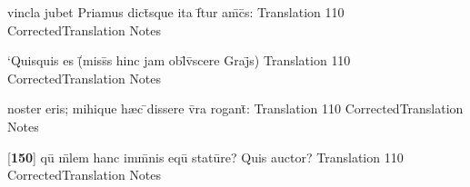 \latline
  {vincla jubet Priamus dict\={\macron {\i}}sque ita f\={}tur am\={\macron {\i}}c\={\macron {\i}}s:}
  { Translation }
  {110}
  { CorrectedTranslation }
  { Notes }


\latline
  {`Quisquis es (\={}miss\={}s hinc jam obl\={\macron {\i}}v\={\macron {\i}}scere Graj\={}s)}
  { Translation }
  {110}
  { CorrectedTranslation }
  { Notes }


\latline
  {noster eris; mihique h{\ae}c \={}dissere v\={}ra rogant\={\macron {\i}}:}
  { Translation }
  {110}
  { CorrectedTranslation }
  { Notes }


\latline
  {[\textbf{150}] qu\={} m\={}lem hanc imm\={}nis equ\={\macron {\i}} statu\={}re?  Quis auctor?}
  { Translation }
  {110}
  { CorrectedTranslation }
  { Notes }


